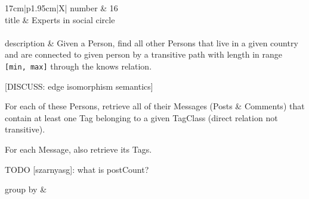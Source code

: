 \renewcommand*{\arraystretch}{1.5}
\noindent\begin{tabularx}{17cm}{|p{1.95cm}|X|}
	\hline
	number      & 16                                                          \\ \hline
	title       & Experts in social circle                                                           \\ \hline
	 \\ \hline
	description & Given a Person, find all other Persons that live in a given country and
are connected to given person by a transitive path with length in range
\texttt{{[}min,\ max{]}} through the knows relation.

{[}DISCUSS: edge isomorphism semantics{]}

For each of these Persons, retrieve all of their Messages (Posts \&
Comments) that contain at least one Tag belonging to a given TagClass
(direct relation not transitive).

For each Message, also retrieve its Tags.

TODO {[}szarnyasg{]}: what is postCount?
 \\ \hline
	
	group by       &
	\\ \hline
	

\end{tabularx}

